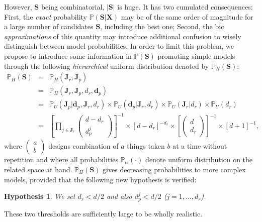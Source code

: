 \documentclass[11pt,a4paper]{article}
\newtheorem{hyp}{Hypothesis}
\begin{document}
However, $\boldsymbol{S}$ being combinatorial, $|\boldsymbol{S}|$ is huge. It has two cumulated consequences: First, the {\it exact} probability $\mathbb{P}(\boldsymbol{S}|\boldsymbol{X})$ may be of the same order of magnitude for a large number of candidates  $\boldsymbol{S}$, including the best one; Second, the {\sc bic} {\it approximations} of this quantity may introduce additional confusion to wisely distinguish between model probabilities. In order to limit this problem, we propose to introduce some information in $\mathbb{P}(\boldsymbol{S})$ promoting simple models through the following {\it hierarchical} uniform distribution denoted by $\mathbb{P}_H(\boldsymbol{S})$:
\begin{eqnarray}
\mathbb{P}_H(\boldsymbol{S}) & = & \mathbb{P}_H(\boldsymbol{J}_r,\boldsymbol{J}_p) \\
 & = & \mathbb{P}_H(\boldsymbol{J}_r,\boldsymbol{J}_p,d_r,\boldsymbol{d}_p) \\
 & = & \mathbb{P}_U(\boldsymbol{J}_p|\boldsymbol{d}_p,\boldsymbol{J}_r,d_r) \times \mathbb{P}_U(\boldsymbol{d}_p|\boldsymbol{J}_r,d_r) \times \mathbb{P}_U(\boldsymbol{J}_r|d_r)\times \mathbb{P}_U(d_r) \\
 & = & \left[\prod_{j\in \boldsymbol{J}_r} \left(\begin{array}{c} d-d_r \\ d_p^j \end{array}\right) \right]^{-1} \times \left[d-d_r\right]^{-d_r} \times \left[\left(\begin{array}{c} d \\ d_r \end{array} \right)\right]^{-1} \times [d+1]^{-1},
\end{eqnarray}
where $\left(\begin{array}{c} a \\ b \end{array}\right)$ designs combination of $a$ things taken $b$ at a time without repetition and where all probabilities $\mathbb{P}_U(\cdot)$ denote uniform distribution on the related space at hand. $\mathbb{P}_H(\boldsymbol{S})$ gives decreasing probabilities to more complex models, provided that the following new hypothesis is verified:

\begin{hyp}\label{H5}
We set $d_r<d/2$ and also $d_p^j<d/2$ ($j=1,\ldots,d_r$).
\end{hyp}

These two thresholds are sufficiently large to be wholly realistic.
\end{document}
